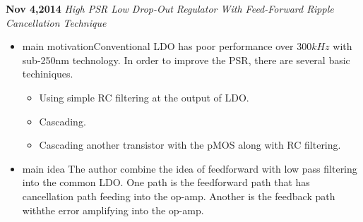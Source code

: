 \documentclass[]{article}
\begin{document}
\noindent \textbf{Nov 4,2014}
\textit{High PSR Low Drop-Out Regulator With Feed-Forward Ripple Cancellation
Technique}
\indent		\begin{itemize}
            \item {main motivation}Conventional LDO has poor performance over
            $300kHz$ with sub-250nm technology. In order to improve the PSR,
            there are several basic techiniques. 
                \begin{itemize}
                    \item Using simple RC filtering at the output of LDO.
                    \item Cascading.
                    \item Cascading another transistor with the pMOS along with
                    RC filtering.
                \end{itemize}
            \item {main idea} The author combine the idea of feedforward with
            low pass filtering into the common LDO. One path is the feedforward
            path that has cancellation path feeding into the op-amp. Another is
            the feedback path withthe error amplifying into the op-amp.
            \end{itemize}
\end{document}
